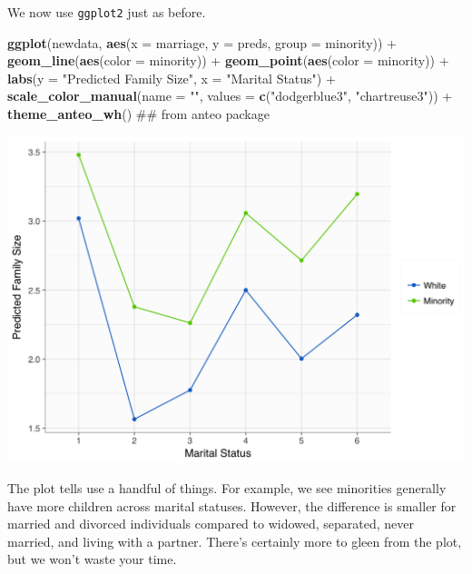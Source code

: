\documentclass[]{tufte-book}
\newenvironment{Shaded}{}{}
\newcommand{\KeywordTok}[1]{\textcolor[rgb]{0.00,0.44,0.13}{\textbf{#1}}}
\newcommand{\DataTypeTok}[1]{\textcolor[rgb]{0.56,0.13,0.00}{#1}}
\newcommand{\StringTok}[1]{\textcolor[rgb]{0.25,0.44,0.63}{#1}}
\newcommand{\OperatorTok}[1]{\textcolor[rgb]{0.40,0.40,0.40}{#1}}
\newcommand{\NormalTok}[1]{#1}
\theoremstyle{definition}
\theoremstyle{definition}
\theoremstyle{remark}
\begin{document}
We now use \texttt{ggplot2} just as before.

\begin{Shaded}
\begin{Highlighting}[]
\KeywordTok{ggplot}\NormalTok{(newdata, }\KeywordTok{aes}\NormalTok{(}\DataTypeTok{x =}\NormalTok{ marriage, }\DataTypeTok{y =}\NormalTok{ preds, }\DataTypeTok{group =}\NormalTok{ minority)) }\OperatorTok{+}\StringTok{ }
\StringTok{    }\KeywordTok{geom_line}\NormalTok{(}\KeywordTok{aes}\NormalTok{(}\DataTypeTok{color =}\NormalTok{ minority)) }\OperatorTok{+}\StringTok{ }\KeywordTok{geom_point}\NormalTok{(}\KeywordTok{aes}\NormalTok{(}\DataTypeTok{color =}\NormalTok{ minority)) }\OperatorTok{+}\StringTok{ }
\StringTok{    }\KeywordTok{labs}\NormalTok{(}\DataTypeTok{y =} \StringTok{"Predicted Family Size"}\NormalTok{, }\DataTypeTok{x =} \StringTok{"Marital Status"}\NormalTok{) }\OperatorTok{+}\StringTok{ }
\StringTok{    }\KeywordTok{scale_color_manual}\NormalTok{(}\DataTypeTok{name =} \StringTok{""}\NormalTok{, }\DataTypeTok{values =} \KeywordTok{c}\NormalTok{(}\StringTok{"dodgerblue3"}\NormalTok{, }
        \StringTok{"chartreuse3"}\NormalTok{)) }\OperatorTok{+}\StringTok{ }\KeywordTok{theme_anteo_wh}\NormalTok{()  ## from anteo package}
\end{Highlighting}
\end{Shaded}

\includegraphics{_main_files/figure-latex/unnamed-chunk-79-1}

The plot tells use a handful of things. For example, we see minorities
generally have more children across marital statuses. However, the
difference is smaller for married and divorced individuals compared to
widowed, separated, never married, and living with a partner. There's
certainly more to gleen from the plot, but we won't waste your time.
\end{document}
